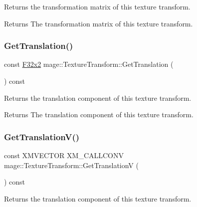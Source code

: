 Returns the transformation matrix of this texture transform.

\begin{DoxyReturn}{Returns}
The transformation matrix of this texture transform. 
\end{DoxyReturn}
\hypertarget{classmage_1_1_texture_transform_ac57e70558e24264fa178f7c7c821397f}{}\label{classmage_1_1_texture_transform_ac57e70558e24264fa178f7c7c821397f} 
\subsubsection{\texorpdfstring{Get\+Translation()}{GetTranslation()}}
{\footnotesize\ttfamily const \hyperlink{namespacemage_aa87237ad091f5cd7da612b8523fc108f}{F32x2} mage\+::\+Texture\+Transform\+::\+Get\+Translation (\begin{DoxyParamCaption}{ }\end{DoxyParamCaption}) const\hspace{0.3cm}{\ttfamily [noexcept]}}

Returns the translation component of this texture transform.

\begin{DoxyReturn}{Returns}
The translation component of this texture transform. 
\end{DoxyReturn}
\hypertarget{classmage_1_1_texture_transform_a17417d31cbffb2c987269c1e94ad37de}{}\label{classmage_1_1_texture_transform_a17417d31cbffb2c987269c1e94ad37de} 
\subsubsection{\texorpdfstring{Get\+Translation\+V()}{GetTranslationV()}}
{\footnotesize\ttfamily const X\+M\+V\+E\+C\+T\+OR X\+M\+\_\+\+C\+A\+L\+L\+C\+O\+NV mage\+::\+Texture\+Transform\+::\+Get\+TranslationV (\begin{DoxyParamCaption}{ }\end{DoxyParamCaption}) const\hspace{0.3cm}{\ttfamily [noexcept]}}

Returns the translation component of this texture transform.

